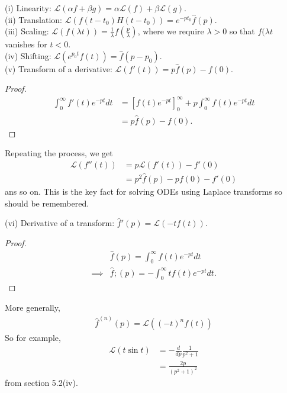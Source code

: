 \documentclass[a4paper]{article}
\begin{document}
(i) Linearity: $\mathcal{L}(\alpha f + \beta g) = \alpha \mathcal{L}(f) + \beta \mathcal{L}(g)$.\\
(ii) Translation: $\mathcal{L}(f(t-t_0)H(t-t_0))=e^{-pt_0}\hat{f}(p)$.\\
(iii) Scaling: $\mathcal{L}(f(\lambda t)) = \frac{1}{\lambda} \hat{f}(\frac{p}{\lambda})$, where we require $\lambda >0$ so that $f(\lambda t$ vanishes for $t<0$.\\
(iv) Shifting: $\mathcal{L}(e^{p_0 t} f(t)) = \hat{f}(p-p_0)$.\\
(v) Transform of a derivative: $\mathcal{L}(f'(t)) = p \hat{f}(p) - f(0)$.
\begin{proof}
\begin{equation*}
\begin{aligned}
\int_0^\infty f'(t) e^{-pt} dt &= [f(t) e^{-pt}]_0^\infty + p\int_0^\infty f(t) e^{-pt} dt\\
&= p \hat{f}(p) - f(0).
\end{aligned}
\end{equation*}
\end{proof}
Repeating the process, we get
\begin{equation*}
\begin{aligned}
\mathcal{L}(f''(t)) &= p\mathcal{L}(f'(t)) - f'(0)\\
&= p^2 \hat{f}(p) - pf(0) - f'(0)
\end{aligned}
\end{equation*}
ans so on. This is the key fact for solving ODEs using Laplace transforms so should be remembered.

(vi) Derivative of a transform: $\hat{f}'(p) = \mathcal{L}(-tf(t))$.
\begin{proof}
\begin{equation*}
\begin{aligned}
&\hat{f}(p) = \int_0^\infty f(t) e^{-pt} dt\\
\implies & \hat{f};(p) = -\int_0^\infty tf(t) e^{-pt} dt.
\end{aligned}
\end{equation*}
\end{proof}
More generally,
\begin{equation*}
\begin{aligned}
\hat{f}^{(n)} (p) = \mathcal{L}((-t)^n f(t))
\end{aligned}
\end{equation*}
So for example,
\begin{equation*}
\begin{aligned}
\mathcal{L} (t\sin t) &= -\frac{d}{dp} \frac{1}{p^2+1}\\
&= \frac{2p}{(p^2+1)^2}
\end{aligned}
\end{equation*}
from section 5.2(iv).
\end{document}
